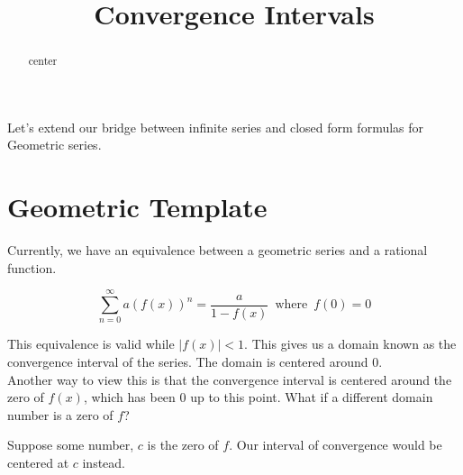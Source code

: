\documentclass{ximera}
\title{Convergence Intervals}
\begin{document}
\begin{abstract}
center
\end{abstract}
\maketitle






Let's extend our bridge between infinite series and closed form formulas for Geometric series.





\section*{Geometric Template}



Currently, we have an equivalence between a geometric series and a rational function.




\[   \sum_{n=0}^{\infty} a (f(x))^n =  \frac{a}{1-f(x)}   \, \text{ where } \, f(0) = 0       \]


This equivalence is valid while $|f(x)| < 1$.  This gives us a domain known as the convergence interval of the series.  The domain is centered around $0$. \\


Another way to view this is that the convergence interval is centered around the zero of $f(x)$, which has been $0$ up to this point.  What if a different domain number is a zero of $f$?


Suppose some number, $c$ is the zero of $f$.  Our interval of convergence would be centered at $c$ instead.
\end{document}
